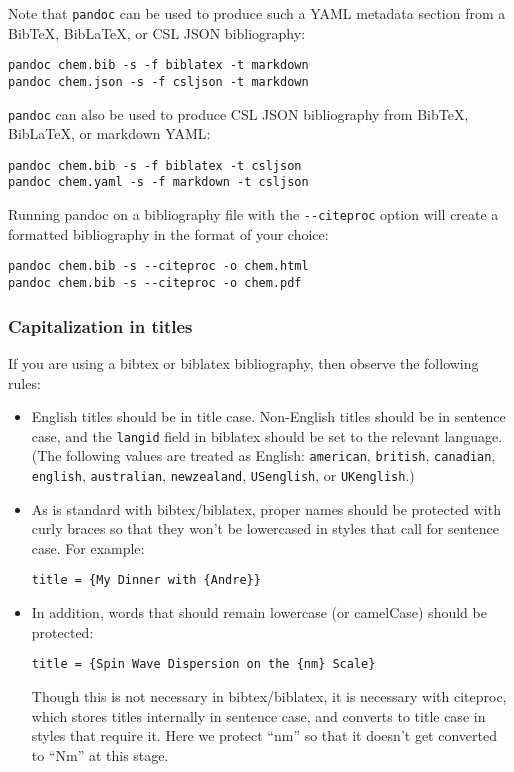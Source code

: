 \documentclass[]{article}
\begin{document}
Note that \texttt{pandoc} can be used to produce such a YAML metadata
section from a BibTeX, BibLaTeX, or CSL JSON bibliography:

\begin{verbatim}
pandoc chem.bib -s -f biblatex -t markdown
pandoc chem.json -s -f csljson -t markdown
\end{verbatim}

\texttt{pandoc} can also be used to produce CSL JSON bibliography from
BibTeX, BibLaTeX, or markdown YAML:

\begin{verbatim}
pandoc chem.bib -s -f biblatex -t csljson
pandoc chem.yaml -s -f markdown -t csljson
\end{verbatim}

Running pandoc on a bibliography file with the \texttt{-\/-citeproc}
option will create a formatted bibliography in the format of your
choice:

\begin{verbatim}
pandoc chem.bib -s --citeproc -o chem.html
pandoc chem.bib -s --citeproc -o chem.pdf
\end{verbatim}

\hypertarget{capitalization-in-titles}{%
\subsubsection{Capitalization in
titles}\label{capitalization-in-titles}}

If you are using a bibtex or biblatex bibliography, then observe the
following rules:

\begin{itemize}
\item
  English titles should be in title case. Non-English titles should be
  in sentence case, and the \texttt{langid} field in biblatex should be
  set to the relevant language. (The following values are treated as
  English: \texttt{american}, \texttt{british}, \texttt{canadian},
  \texttt{english}, \texttt{australian}, \texttt{newzealand},
  \texttt{USenglish}, or \texttt{UKenglish}.)
\item
  As is standard with bibtex/biblatex, proper names should be protected
  with curly braces so that they won't be lowercased in styles that call
  for sentence case. For example:

\begin{verbatim}
title = {My Dinner with {Andre}}
\end{verbatim}
\item
  In addition, words that should remain lowercase (or camelCase) should
  be protected:

\begin{verbatim}
title = {Spin Wave Dispersion on the {nm} Scale}
\end{verbatim}

  Though this is not necessary in bibtex/biblatex, it is necessary with
  citeproc, which stores titles internally in sentence case, and
  converts to title case in styles that require it. Here we protect
  ``nm'' so that it doesn't get converted to ``Nm'' at this stage.
\end{itemize}
\end{document}
